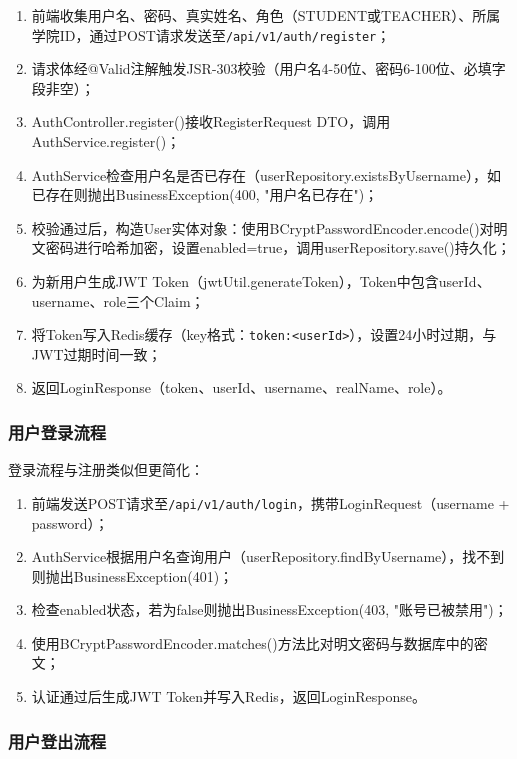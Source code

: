 \documentclass{../../softeng}
\begin{document}
\begin{enumerate}
    \item 前端收集用户名、密码、真实姓名、角色（STUDENT或TEACHER）、所属学院ID，通过POST请求发送至\verb|/api/v1/auth/register|；
    \item 请求体经@Valid注解触发JSR-303校验（用户名4-50位、密码6-100位、必填字段非空）；
    \item AuthController.register()接收RegisterRequest DTO，调用AuthService.register()；
    \item AuthService检查用户名是否已存在（userRepository.existsByUsername），如已存在则抛出BusinessException(400, "用户名已存在")；
    \item 校验通过后，构造User实体对象：使用BCryptPasswordEncoder.encode()对明文密码进行哈希加密，设置enabled=true，调用userRepository.save()持久化；
    \item 为新用户生成JWT Token（jwtUtil.generateToken），Token中包含userId、username、role三个Claim；
    \item 将Token写入Redis缓存（key格式：\verb|token:<userId>|），设置24小时过期，与JWT过期时间一致；
    \item 返回LoginResponse（token、userId、username、realName、role）。
\end{enumerate}

\subsubsection{用户登录流程}

登录流程与注册类似但更简化：

\begin{enumerate}
    \item 前端发送POST请求至\verb|/api/v1/auth/login|，携带LoginRequest（username + password）；
    \item AuthService根据用户名查询用户（userRepository.findByUsername），找不到则抛出BusinessException(401)；
    \item 检查enabled状态，若为false则抛出BusinessException(403, "账号已被禁用")；
    \item 使用BCryptPasswordEncoder.matches()方法比对明文密码与数据库中的密文；
    \item 认证通过后生成JWT Token并写入Redis，返回LoginResponse。
\end{enumerate}

\subsubsection{用户登出流程}
\end{document}

